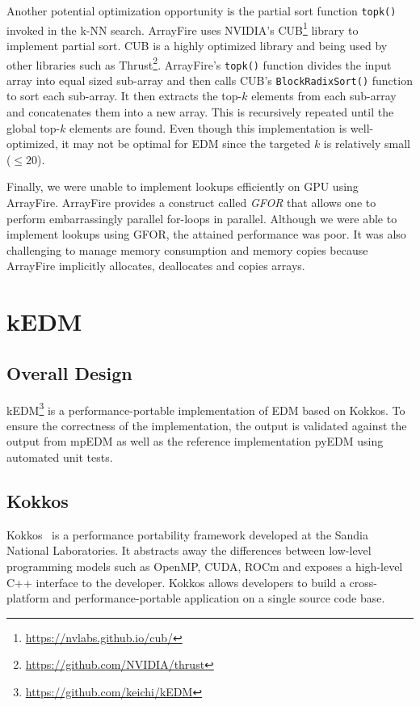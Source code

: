 \documentclass[conference]{IEEEtran}
\begin{document}
Another potential optimization opportunity is the partial sort function
\texttt{topk()} invoked in the k-NN search. ArrayFire uses NVIDIA's
CUB\footnote{\url{https://nvlabs.github.io/cub/}} library to implement partial
sort. CUB is a highly optimized library and being used by other libraries such
as Thrust\footnote{\url{https://github.com/NVIDIA/thrust}}. ArrayFire's
\texttt{topk()} function divides the input array into equal sized sub-array
and then calls CUB's \texttt{BlockRadixSort()} function to sort each
sub-array. It then extracts the top-$k$ elements from each sub-array and
concatenates them into a new array. This is recursively repeated until the
global top-$k$ elements are found. Even though this implementation is
well-optimized, it may not be optimal for EDM since the targeted $k$ is
relatively small ($\leq 20$).

Finally, we were unable to implement lookups efficiently on GPU using
ArrayFire. ArrayFire provides a construct called \textit{GFOR} that allows one
to perform embarrassingly parallel for-loops in parallel. Although we were
able to implement lookups using GFOR, the attained performance was poor. It
was also challenging to manage memory consumption and memory copies because
ArrayFire implicitly allocates, deallocates and copies arrays.

\section{kEDM}\label{sec:proposal}

\subsection{Overall Design}

kEDM\footnote{\url{https://github.com/keichi/kEDM}} is a performance-portable
implementation of EDM based on Kokkos. To ensure the correctness of the
implementation, the output is validated against the output from mpEDM as well
as the reference implementation pyEDM using automated unit tests.

\subsection{Kokkos}

Kokkos~\cite{Edwards2014} is a performance portability framework developed at
the Sandia National Laboratories. It abstracts away the differences between
low-level programming models such as OpenMP, CUDA, ROCm and exposes a
high-level C++ interface to the developer. Kokkos allows developers to build a
cross-platform and performance-portable application on a single source code
base.
\end{document}
